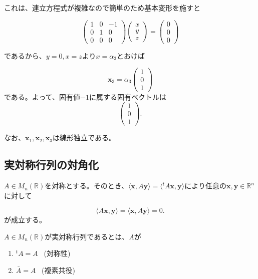 \documentclass[dvipdfmx,autodetect-engine]{jsarticle}
\theoremstyle{definition}
\newcommand{\transposeMat}[1]{{}^t\!{#1}}
\newcommand{\vecSpace}[1]{\mathbb{R}^{#1}}
\begin{document}
{これは、連立方程式が複雑なので簡単のため基本変形を施すと

$$
\begin{pmatrix}
1 & 0 & -1 \\
0 & 1 & 0 \\
0 & 0 & 0
\end{pmatrix}\begin{pmatrix}
x \\
y \\
z
\end{pmatrix} = \begin{pmatrix}
0 \\
0 \\
0
\end{pmatrix}
$$

であるから、$y = 0, x = z$より$x = \alpha_3$とおけば

$$
\bm{x}_3 = \alpha_3 \begin{pmatrix}
1 \\
0 \\
1
\end{pmatrix}
$$
である。よって、固有値$-1$に属する固有ベクトルは$$
\begin{pmatrix}
1 \\
0 \\
1
\end{pmatrix}.
$$

なお、$\bm{x}_1, \bm{x}_2, \bm{x}_3$は線形独立である。
}

\subsection{実対称行列の対角化}

$A \in M_n(\mathbb{R})$を対称とする。そのとき、$\langle \bm{x}, A\bm{y} \rangle = \langle {\transposeMat{A}}\bm{x}, \bm{y} \rangle$により任意の$\bm{x}, \bm{y} \in \vecSpace{n}$に対して

\begin{equation}
\label{symmetricMatrixEquation-1}
\langle A\bm{x}, \bm{y} \rangle = \langle \bm{x}, A\bm{y} \rangle = 0.
\end{equation}
が成立する。


$A \in M_n(\mathbb{R})$が実対称行列であるとは、$A$が

\begin{enumerate}
\renewcommand{\labelenumi}{(\arabic{enumi})}
\item $\transposeMat{A} = A$ \ (対称性)
\item $\bar{A} = A$ \ (複素共役)
\end{enumerate}
\end{document}
